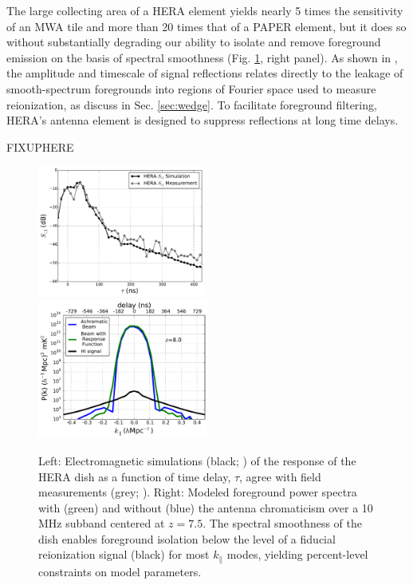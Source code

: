 \documentclass[preprint,11pt]{aastex}
\newcommand{\Mycitet}[1]{\citet{#1}}
\begin{document}
The large collecting area of a
HERA element yields nearly 5 times the sensitivity of an MWA tile and more
than 20 times that of a PAPER element, but it does so without substantially
degrading our ability to isolate and remove foreground emission on the basis of
spectral smoothness (Fig. \ref{fig:reflectometry}, right panel).  As shown in
\Mycitet{parsons_et_al2012b}, the amplitude and timescale of signal reflections
relates directly to the leakage of smooth-spectrum foregrounds into regions of Fourier space 
used to measure reionization, as discuss in Sec. \ref{sec:wedge}.
To facilitate foreground filtering, HERA's antenna element is designed to suppress reflections at long time delays.

FIXUPHERE
\begin{figure}[h!]
	\centering
    \includegraphics[width=0.49\textwidth]{plots/s11_compare_msip.pdf}
\includegraphics[width=0.5\textwidth]{plots/ps1d_with_delay_kernel.pdf}
	\vspace{-25pt}
	\caption{Left: Electromagnetic simulations (black; \citealt{ewallwice_et_al2016}) of the response of the HERA dish as a function of time delay, $\tau$,
       agree with field measurements (grey; \citealt{patra_et_al2016}). 
Right: Modeled foreground power spectra with (green) and without (blue) the antenna chromaticism over a 10\,MHz subband centered at $z=7.5$. The spectral smoothness of the dish enables foreground isolation below the level of a fiducial reionization signal (black) for most $k_{\parallel}$ modes, yielding percent-level constraints on model parameters.}
	\label{fig:reflectometry}
	\vspace{-10pt}
\end{figure}
\end{document}
